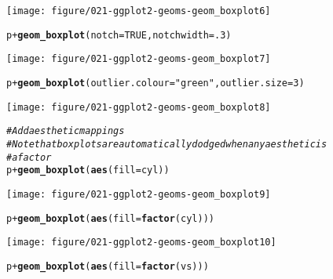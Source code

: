 \documentclass[a4paper,titlepage]{tufte-handout}\usepackage[]{graphicx}\usepackage[]{color}
\makeatletter
\def\maxwidth{ %
  \ifdim\Gin@nat@width>\linewidth
    \linewidth
  \else
    \Gin@nat@width
  \fi
}
\newcommand{\hlnum}[1]{\textcolor[rgb]{0.686,0.059,0.569}{#1}}%
\newcommand{\hlstr}[1]{\textcolor[rgb]{0.192,0.494,0.8}{#1}}%
\newcommand{\hlcom}[1]{\textcolor[rgb]{0.678,0.584,0.686}{\textit{#1}}}%
\newcommand{\hlopt}[1]{\textcolor[rgb]{0,0,0}{#1}}%
\newcommand{\hlstd}[1]{\textcolor[rgb]{0.345,0.345,0.345}{#1}}%
\newcommand{\hlkwc}[1]{\textcolor[rgb]{0.333,0.667,0.333}{#1}}%
\newcommand{\hlkwd}[1]{\textcolor[rgb]{0.737,0.353,0.396}{\textbf{#1}}}%
\newenvironment{kframe}{%
 \def\at@end@of@kframe{}%
 \ifinner\ifhmode%
  \def\at@end@of@kframe{\end{minipage}}%
  \begin{minipage}{\columnwidth}%
 \fi\fi%
 \def\FrameCommand##1{\hskip\@totalleftmargin \hskip-\fboxsep
 \colorbox{shadecolor}{##1}\hskip-\fboxsep
     \hskip-\linewidth \hskip-\@totalleftmargin \hskip\columnwidth}%
 \MakeFramed {\advance\hsize-\width
   \@totalleftmargin\z@ \linewidth\hsize
   \@setminipage}}%
 {\par\unskip\endMakeFramed%
 \at@end@of@kframe}
\newenvironment{knitrout}{}{} %
\makeatother
\begin{document}
\begin{knitrout}
\begin{kframe}
{\ttfamily\noindent\itshape\color{messagecolor}{\#\# notch went outside hinges. Try setting notch=FALSE.\\\#\# notch went outside hinges. Try setting notch=FALSE.}}\end{kframe}
\texttt{[image: figure/021-ggplot2-geoms-geom\_boxplot6]} 
\begin{kframe}\begin{alltt}
\hlstd{p} \hlopt{+} \hlkwd{geom_boxplot}\hlstd{(}\hlkwc{notch} \hlstd{=} \hlnum{TRUE}\hlstd{,} \hlkwc{notchwidth} \hlstd{=} \hlnum{.3}\hlstd{)}
\end{alltt}


{\ttfamily\noindent\itshape\color{messagecolor}{\#\# notch went outside hinges. Try setting notch=FALSE.\\\#\# notch went outside hinges. Try setting notch=FALSE.}}\end{kframe}
\texttt{[image: figure/021-ggplot2-geoms-geom\_boxplot7]} 
\begin{kframe}\begin{alltt}
\hlstd{p} \hlopt{+} \hlkwd{geom_boxplot}\hlstd{(}\hlkwc{outlier.colour} \hlstd{=} \hlstr{"green"}\hlstd{,} \hlkwc{outlier.size} \hlstd{=} \hlnum{3}\hlstd{)}
\end{alltt}
\end{kframe}
\texttt{[image: figure/021-ggplot2-geoms-geom\_boxplot8]} 
\begin{kframe}\begin{alltt}
\hlcom{# Add aesthetic mappings}
\hlcom{# Note that boxplots are automatically dodged when any aesthetic is}
\hlcom{# a factor}
\hlstd{p} \hlopt{+} \hlkwd{geom_boxplot}\hlstd{(}\hlkwd{aes}\hlstd{(}\hlkwc{fill} \hlstd{= cyl))}
\end{alltt}
\end{kframe}
\texttt{[image: figure/021-ggplot2-geoms-geom\_boxplot9]} 
\begin{kframe}\begin{alltt}
\hlstd{p} \hlopt{+} \hlkwd{geom_boxplot}\hlstd{(}\hlkwd{aes}\hlstd{(}\hlkwc{fill} \hlstd{=} \hlkwd{factor}\hlstd{(cyl)))}
\end{alltt}
\end{kframe}
\texttt{[image: figure/021-ggplot2-geoms-geom\_boxplot10]} 
\begin{kframe}\begin{alltt}
\hlstd{p} \hlopt{+} \hlkwd{geom_boxplot}\hlstd{(}\hlkwd{aes}\hlstd{(}\hlkwc{fill} \hlstd{=} \hlkwd{factor}\hlstd{(vs)))}

\end{alltt}
\end{kframe}
\end{knitrout}
\end{document}

